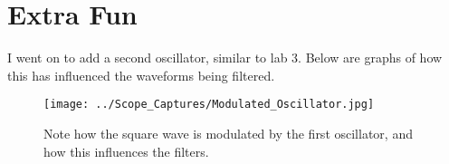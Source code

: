 \documentclass[11pt]{article} %
\begin{document}
\section{Extra Fun}
I went on to add a second oscillator, similar to lab 3. Below are graphs of how this has influenced the waveforms being filtered.

\begin{figure} [H]
	\centering
	\texttt{[image: ../Scope\_Captures/Modulated\_Oscillator.jpg]}
	\caption {Note how the square wave is modulated by the first oscillator, and how this influences the filters.} %
	\label{fig:Second_Oscillator} %
\end{figure}
\end{document}
